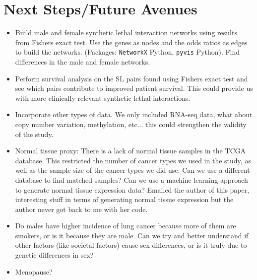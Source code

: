 \documentclass[10pt]{article}
\begin{document}
\section{Next Steps/Future Avenues}
\begin{itemize}
	\item Build male and female synthetic lethal interaction networks using results from Fishers exact test. Use the genes as nodes and the odds ratios as edges to build the networks. (Packages: \texttt{NetworkX} Python, \texttt{pyvis} Python). Find differences in the male and female networks.
	\item Perform survival analysis on the SL pairs found using Fishers exact test and see which pairs contribute to improved patient survival. This could provide us with more clinically relevant synthetic lethal interactions.
	\item Incorporate other types of data. We only included RNA-seq data, what about copy number variation, methylation, etc... this could strengthen the validity of the study.
	\item Normal tissue proxy: There is a lack of normal tissue samples in the TCGA database. This restricted the number of cancer types we used in the study, as well as the sample size of the cancer types we did use. Can we use a different database to find matched samples? Can we use a machine learning approach to generate normal tissue expression data? Emailed the author of this paper, interesting stuff in terms of generating normal tissue expression but the author never got back to me with her code. \citep{zeng2019selecting}
	\item Do males have higher incidence of lung cancer because more of them are smokers, or is it because they are male. Can we try and better understand if other factors (like societal factors) cause sex differences, or is it truly due to genetic differences in sex?
	\item Menopause?
\end{itemize}



\end{document}
